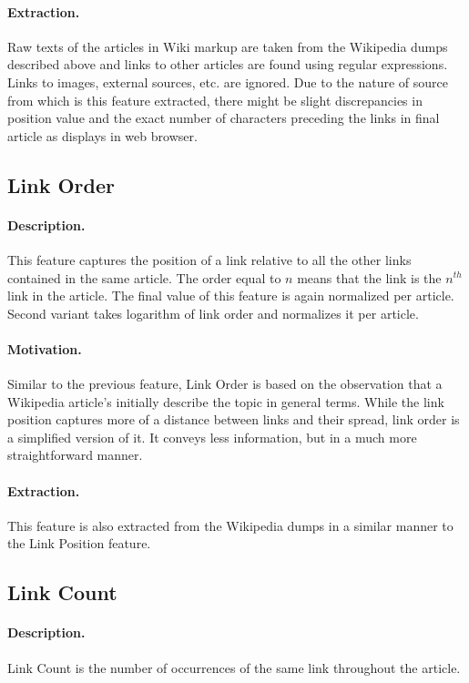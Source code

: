 \paragraph{Extraction.}
Raw texts of the articles in Wiki markup are taken from the Wikipedia dumps described above and links to other articles are found using regular expressions. Links to images, external sources, etc. are ignored. Due to the nature of source from which is this feature extracted, there might be slight discrepancies in position value and the exact number of characters preceding the links in final article as displays in web browser.

\subsection{Link Order}
\label{link order}
\paragraph{Description.}
This feature captures the position of a link relative to all the other links contained in the same article. The order equal to $n$ means that the link is the $n^{th}$ link in the article. The final value of this feature is again normalized per article. Second variant takes logarithm of link order and normalizes it per article.

\paragraph{Motivation.}
Similar to the previous feature, Link Order is based on the observation that a Wikipedia article's initially describe the topic in general terms. While the link position captures more of a distance between links and their spread, link order is a simplified version of it. It conveys less information, but in a much more straightforward manner.

\paragraph{Extraction.}
This feature is also extracted from the Wikipedia dumps in a similar manner to the Link Position feature.

\subsection{Link Count}
\label{link count}
\paragraph{Description.}
Link Count is the number of occurrences of the same link throughout the article.

